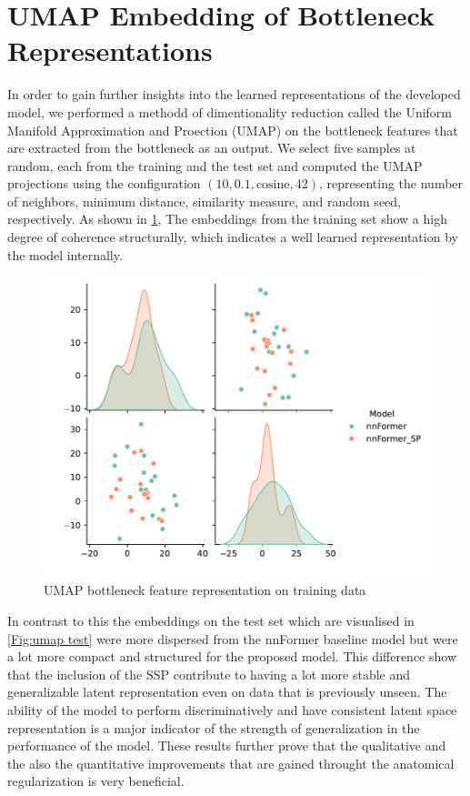 \section{UMAP Embedding of Bottleneck Representations}
In order to gain further insights into the learned representations of the developed model, we performed a methodd of dimentionality reduction called the Uniform Manifold Approximation and Proection (UMAP) \cite{McInnes2018} on the bottleneck features that are extracted from the bottleneck as an output. We select five samples at random, each from the training and the test set and computed the UMAP projections using the configuration $(10, 0.1, \text{cosine}, 42)$, representing the number of neighbors, minimum distance, similarity measure, and random seed, respectively. As shown in \cref{Fig:umap train}, The embeddings from the training set show a high degree of coherence structurally, which indicates a well learned representation by the model internally. 

\begin{figure}[htb!]  %
    \centering
	\centering
	\includegraphics[width=1\textwidth]{images/Umap_train.pdf}
	\caption{\centering UMAP bottleneck feature representation on training data}
	\label{Fig:umap train}
\end{figure}

In contrast to this the embeddings on the test set which are visualised in \cref{Fig:umap test} were more dispersed from the nnFormer baseline model but were a lot more compact and structured for the proposed model. This difference show that the inclusion of the SSP contribute to having a lot more stable and generalizable latent representation even on data that is previously unseen. The ability of the model to perform discriminatively and have consistent latent space representation is a major indicator of the strength of generalization in the performance of the model. These results further prove that the qualitative and the also the quantitative improvements that are gained throught the anatomical regularization is very beneficial.



